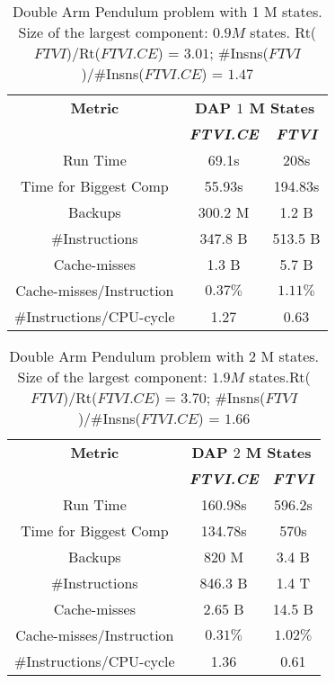 \documentclass[conference]{IEEEtran}
\begin{document}
\begin{table}[h!]
\caption{Double Arm Pendulum problem with 1 M states. Size of the largest component: $0.9 M$ states. Rt($FTVI$)/Rt($FTVI.CE$) = $3.01$; \#Insns($FTVI$)/\#Insns($FTVI.CE$) = $1.47$}
\vskip 0.18in
\begin{center}
\begin{small}
\begin{sc}
\begin{tabular}{|c|c|c|}
\hline
\textbf{Metric}&\multicolumn{2}{|c|}{\textbf{DAP $1$ M States}} \\
\cline{2-3} 
\textbf{} & \textbf{\textit{FTVI.CE}} & \textbf{\textit{FTVI}} \\
\hline
Run Time & 69.1s & 208s \\
\hline
Time for Biggest Comp & 55.93s & 194.83s \\
\hline
Backups & 300.2 M & 1.2 B \\
\hline
\#Instructions & 347.8 B & 513.5 B \\
\hline
Cache-misses & 1.3 B & 5.7 B \\
\hline 
Cache-misses/Instruction & $0.37\%$ & $1.11\%$ \\
\hline
\#Instructions/CPU-cycle & 1.27 & 0.63 \\
\hline%
\end{tabular}
\label{tab4}
\end{sc}
\end{small}
\end{center}
\vskip -0.1in
\end{table}

\begin{table}[h!]
\caption{Double Arm Pendulum problem with 2 M states. Size of the largest component: $1.9 M$ states.Rt($FTVI$)/Rt($FTVI.CE$) = $3.70$; \#Insns($FTVI$)/\#Insns($FTVI.CE$) = $1.66$}
\vskip 0.18in
\begin{center}
\begin{small}
\begin{sc}
\begin{tabular}{|c|c|c|}
\hline
\textbf{Metric}&\multicolumn{2}{|c|}{\textbf{DAP $2$ M States}} \\
\cline{2-3}
\textbf{} & \textbf{\textit{FTVI.CE}} & \textbf{\textit{FTVI}} \\
\hline
Run Time & 160.98s & 596.2s \\
\hline
Time for Biggest Comp & 134.78s & 570s \\
\hline
Backups & 820 M & 3.4 B \\
\hline
\#Instructions & 846.3 B & 1.4 T \\
\hline
Cache-misses & 2.65 B & 14.5 B \\
\hline 
Cache-misses/Instruction & $0.31\%$ & $1.02\%$ \\
\hline
\#Instructions/CPU-cycle & 1.36 & 0.61 \\
\hline%
\end{tabular}
\label{tab5}
\end{sc}
\end{small}
\end{center}
\end{table}
\end{document}
